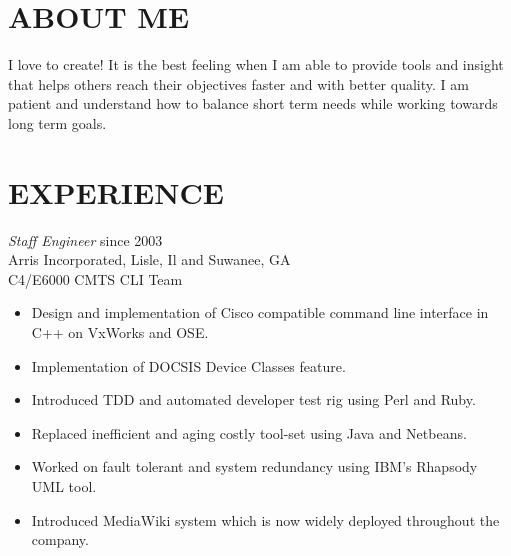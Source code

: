 \documentclass[line,margin]{res}
\begin{document}
\address{2910 Saddlebrook Glen Dr.}
\address{Cumming, GA 30041}

\begin{resume}
\section{ABOUT ME} I love to create!  It is the best feeling when I am able to provide tools and insight that helps others 
                reach their objectives faster and with better quality. I am patient and understand how to balance short
                term needs while working towards long term goals.

\section{EXPERIENCE} {\sl Staff Engineer} \hfill since 2003 \\
                Arris Incorporated, Lisle, Il and Suwanee, GA \\
                C4/E6000 CMTS CLI Team
                 \begin{itemize}  \itemsep -2pt %
                 \item Design and implementation of Cisco compatible command line interface in C++ on VxWorks and OSE.
                 \item Implementation of DOCSIS Device Classes feature.
                 \item Introduced TDD and automated developer test rig using Perl and Ruby.
                 \item Replaced inefficient and aging costly tool-set using Java and Netbeans.
                 \item Worked on fault tolerant and system redundancy using IBM's Rhapsody UML tool.
                 \item Introduced MediaWiki system which is now widely deployed throughout the company.
                 \end{itemize}


\end{resume}
\end{document}
